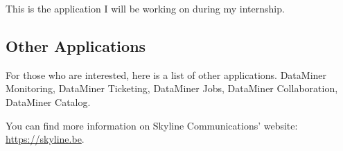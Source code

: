  This is the application I will be working on during my internship.
 
 
\subsection{Other Applications}
For those who are interested, here is a list of other applications. DataMiner Monitoring, DataMiner Ticketing, DataMiner Jobs, DataMiner Collaboration, DataMiner Catalog. 

You can find more information on Skyline Communications' website: \url{https://skyline.be}.

